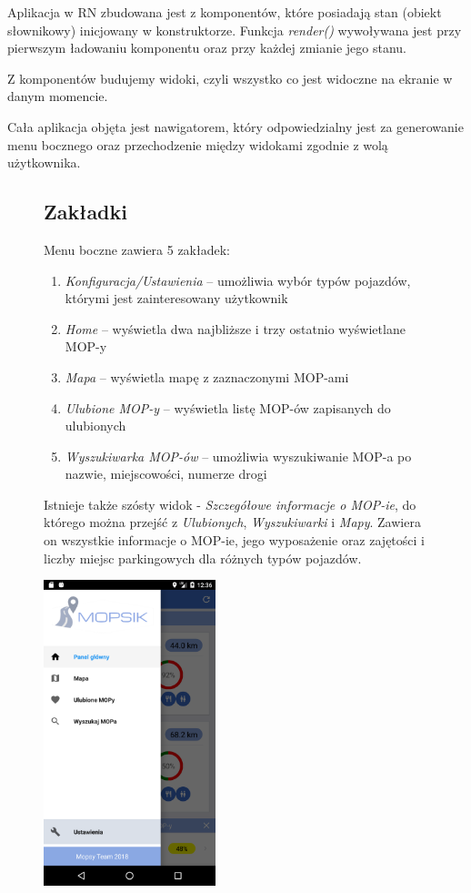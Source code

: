 Aplikacja w RN zbudowana jest z komponentów, które posiadają stan (obiekt słownikowy) inicjowany w konstruktorze. Funkcja \textit{render()} wywoływana jest przy pierwszym ładowaniu komponentu oraz przy każdej zmianie jego stanu. 

Z komponentów budujemy widoki, czyli wszystko co jest widoczne na ekranie w danym momencie.

Cała aplikacja objęta jest nawigatorem, który odpowiedzialny jest za generowanie menu bocznego oraz przechodzenie między widokami zgodnie z wolą użytkownika. \\

\begin{figure}[!htb]
\centering
\begin{minipage}{.6\textwidth}
\subsection{Zakładki}
Menu boczne zawiera 5 zakładek: 
\begin{enumerate}
\item \textit{Konfiguracja/Ustawienia} -- umożliwia wybór typów pojazdów, którymi jest zainteresowany użytkownik
\item \textit{Home} -- wyświetla dwa najbliższe i trzy ostatnio wyświetlane MOP-y
\item \textit{Mapa} -- wyświetla mapę z zaznaczonymi MOP-ami
\item \textit{Ulubione MOP-y} -- wyświetla listę MOP-ów zapisanych do ulubionych
\item \textit{Wyszukiwarka MOP-ów} -- umożliwia wyszukiwanie MOP-a po nazwie, miejscowości, numerze drogi
\end{enumerate}
Istnieje także szósty widok - \textit{Szczegółowe informacje o MOP-ie}, do którego można przejść z \textit{Ulubionych}, \textit{Wyszukiwarki} i \textit{Mapy}. Zawiera on wszystkie informacje o MOP-ie, jego wyposażenie oraz zajętości i liczby miejsc parkingowych dla różnych typów pojazdów.
\end{minipage}%
\begin{minipage}{.4\textwidth}
  \centering
  \includegraphics[width=5cm]{images/mopsik_mobile/menu.png}
  \label{mopsik_menu}
\end{minipage}
\end{figure}


